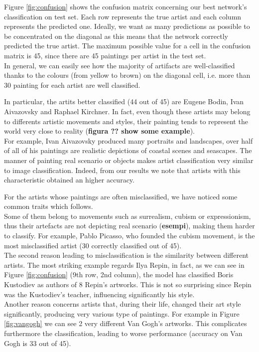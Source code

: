 \documentclass{article}
\begin{document}
Figure \ref{fig:confusion} shows the confusion matrix concerning our best network's classification on test set. Each row represents the true artist and each column represents the predicted one. Ideally, we want as many predictions as possible to be concentrated on the diagonal as this means that the network correctly predicted the true artist. The maximum possible value for a cell in the confusion matrix is 45, since there are 45 paintings per artist in the test set.\\
In general, we can easily see how the majority of artifacts are well-classified thanks to the colours (from yellow to brown) on the diagonal cell, i.e. more than 30 painting for each artist are well classified.

In particular, the artits better classified (44 out of 45) are Eugene Bodin, Ivan Aivazovsky and Raphael Kirchner. In fact, even though these artists may belong to differents artistic movements and styles, their painting tends to represent the world very close to reality (\textbf{figura ?? show some example}).\\
For example, Ivan Aivazovsky produced many portraits and landscapes, over half of all of his paintings are realistic depictions of coastal scenes and seascapes. The manner of painting real scenario or objects makes artist classification very similar to image classification. Indeed, from our results we note that artists with this characteristic obtained an higher accuracy.

For the artists whose paintings are often misclassified, we have noticed some common traits which follows.\\
Some of them belong to movements such as surrealism, cubism or expressionism, thus their artefacts are not depicting real scenario (\textbf{esempi}), making them harder to classify.
For example, Pablo Picasso, who founded the cubism movement, is the most misclassified artist (30 correctly classified out of 45).\\
The second reason leading to misclassification is the similarity  between different artists. The most striking example regards Ilya Repin, in fact, as we can see in Figure \ref{fig:confusion} (9th row, 2nd column), the model has classified Boris Kustodiev as authors of 8 Repin's artworks. This is not so surprising since Repin was the Kustodiev's teacher, influencing significantly his style. \\
Another reason concerns artists that, during their life, changed their art style significantly, producing very various type of paintings. For example in Figure \ref{fig:vangogh} we can see 2 very different Van Gogh's artworks. This complicates furthermore the classification, leading to worse performance (accuracy on Van Gogh is 33 out of 45).
\end{document}
